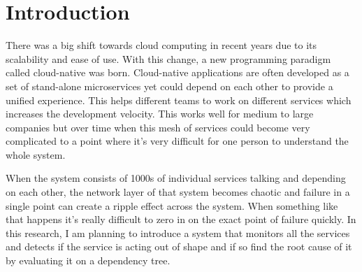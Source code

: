 \section{Introduction}

There was a big shift towards cloud computing in recent years due to its scalability and  ease of use. With this change, a new programming paradigm called cloud-native was born. Cloud-native applications are often developed as a set of stand-alone microservices \citep{dragoni2017microservices} yet could depend on each other to provide a unified experience. This helps different teams to work on different services which increases the development velocity. This works well for medium to large companies but over time when this mesh of services could become very complicated to a point where it's very difficult for one person to understand the whole system.

When the system consists of 1000s of individual services talking and depending on each other, the network layer of that system becomes chaotic \citep{Introduc54:online} and failure in a single point can create a ripple effect across the system. When something like that happens it's really difficult to zero in on the exact point of failure quickly. In this research, I am planning to introduce a system that monitors all the services and detects if the service is acting out of shape and if so find the root cause of it by evaluating it on a dependency tree.